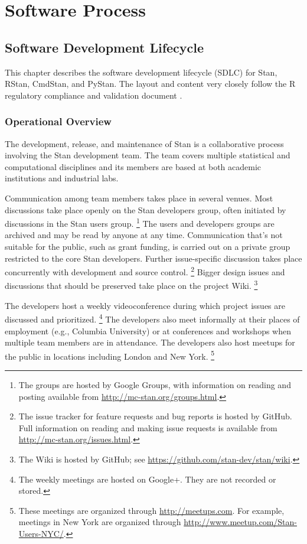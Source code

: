 \part{Software Process}

\chapter{Software Development Lifecycle}\label{software-development.chapter}

This chapter describes the software development lifecycle (SDLC) for
Stan, RStan, CmdStan, and PyStan. The layout and content very closely
follow the R regulatory compliance and validation document
\citep[Section~6]{RProject:2014}.

\section{Operational Overview}

The development, release, and maintenance of Stan is a collaborative
process involving the Stan development team.  The team covers multiple
statistical and computational disciplines and its members are based at
both academic institutions and industrial labs.

Communication among team members takes place in several venues.  Most
discussions take place openly on the Stan developers group, often
initiated by discussions in the Stan users group.%
%
\footnote{The groups are hosted by Google Groups, with information on
  reading and posting available from \url{http://mc-stan.org/groups.html}.}
%
The users and developers groups are archived and may be read by
anyone at any time. Communication that's not suitable for the public,
such as grant funding, is carried out on a private group restricted to
the core Stan developers. Further issue-specific discussion takes
place concurrently with development and source control.%
%
\footnote{The issue tracker for feature requests and bug reports is
  hosted by GitHub.  Full information on reading and making issue
  requests is available from \url{http://mc-stan.org/issues.html}.}
%
Bigger design issues and discussions that should be preserved take
place on the project Wiki.%
%
\footnote{The Wiki is hosted by GitHub; see
  \url{https://github.com/stan-dev/stan/wiki}.}

The developers host a weekly videoconference during which project
issues are discussed and prioritized.%
%
\footnote{The weekly meetings are hosted on Google+.  They are not
  recorded or stored.}
%
The developers also meet informally at their places of employment
(e.g., Columbia University) or at conferences and workshops when
multiple team members are in attendance.  The developers also host
meetups for the public in locations including London and New York.%
%
\footnote{These meetings are organized through
  \url{http://meetups.com}.  For example, meetings in New York are
  organized through \url{http://www.meetup.com/Stan-Users-NYC/}.}

